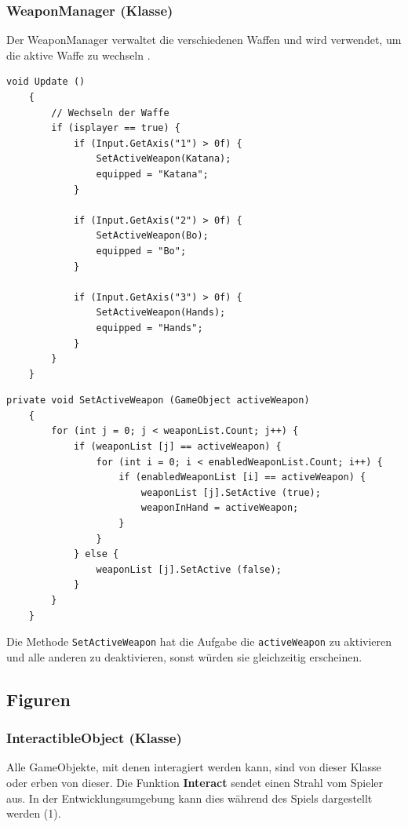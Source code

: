 \subsubsection{WeaponManager (Klasse)}
Der WeaponManager verwaltet die verschiedenen Waffen und wird verwendet, um die aktive Waffe zu wechseln .

\begin{lstlisting}[caption={Wechsel der Waffen je nach Taste}]
	void Update ()
	{
		// Wechseln der Waffe
		if (isplayer == true) {
			if (Input.GetAxis("1") > 0f) {
				SetActiveWeapon(Katana);
				equipped = "Katana";
			}

			if (Input.GetAxis("2") > 0f) {
				SetActiveWeapon(Bo);
				equipped = "Bo";
			}

			if (Input.GetAxis("3") > 0f) {
				SetActiveWeapon(Hands);
				equipped = "Hands";
			}
		}
	}
\end{lstlisting}

\begin{lstlisting}[caption={Aktivieren einer Waffe}]
	private void SetActiveWeapon (GameObject activeWeapon)
	{
		for (int j = 0; j < weaponList.Count; j++) {
			if (weaponList [j] == activeWeapon) {
				for (int i = 0; i < enabledWeaponList.Count; i++) {
					if (enabledWeaponList [i] == activeWeapon) {
						weaponList [j].SetActive (true);
						weaponInHand = activeWeapon;
					}
				}
			} else {
				weaponList [j].SetActive (false);
			}
		}
	}
\end{lstlisting}

Die Methode \lstinline{SetActiveWeapon} hat die Aufgabe die \lstinline{activeWeapon} zu aktivieren und alle anderen zu deaktivieren, sonst würden sie gleichzeitig erscheinen.

\subsection{Figuren}

\subsubsection{InteractibleObject (Klasse)}
\label{subsubsec:interactibleobject}
Alle GameObjekte, mit denen interagiert werden kann, sind von dieser Klasse oder erben von dieser.
Die Funktion \textbf{Interact} sendet einen Strahl vom Spieler aus. In der Entwicklungsumgebung kann dies während des Spiels dargestellt werden (1).

